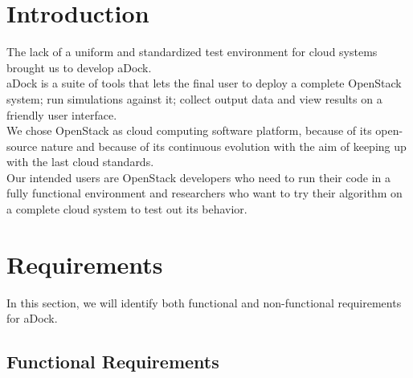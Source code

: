 
%
%




\section{Introduction}
\label{sec:adock_intro}
The lack of a uniform and standardized test environment for cloud systems brought us to develop aDock.\\
aDock is a suite of tools that lets the final user to deploy a complete OpenStack system; run simulations against it; collect output data and view results on a friendly user interface.\\
We chose OpenStack as cloud computing software platform, because of its open-source nature and because of its continuous evolution with the aim of keeping up with the last cloud standards.\\
Our intended users are OpenStack developers who need to run their code in a fully functional environment and researchers who want to try their algorithm on a complete cloud system to test out its behavior.

\section{Requirements}
\label{sec:adock_reqs}
In this section, we will identify both functional and non-functional requirements for aDock.

\subsection{Functional Requirements}
\label{sub:func_req}

